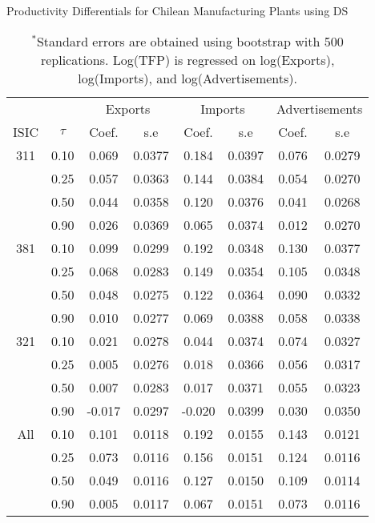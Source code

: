 \documentclass[12pt]{article}
\begin{document}
\begin{table}[H]
\centering
\caption{Productivity Differentials for Chilean Manufacturing Plants using DS}
\small
\begin{tabular}{cccccccc}
  \hline\hline & & \multicolumn{2}{c}{Exports}  & \multicolumn{2}{c}{Imports} & \multicolumn{2}{c}{Advertisements} \\ \cmidrule(lr){3-4} \cmidrule(lr){5-6} \cmidrule(lr){7-8}ISIC & $\tau$ & Coef. & s.e & Coef. & s.e & Coef. & s.e \\ 
  \hline
311 & 0.10 & 0.069 & 0.0377 & 0.184 & 0.0397 & 0.076 & 0.0279 \\ 
   & 0.25 & 0.057 & 0.0363 & 0.144 & 0.0384 & 0.054 & 0.0270 \\ 
   & 0.50 & 0.044 & 0.0358 & 0.120 & 0.0376 & 0.041 & 0.0268 \\ 
   & 0.90 & 0.026 & 0.0369 & 0.065 & 0.0374 & 0.012 & 0.0270 \\ 
  381 & 0.10 & 0.099 & 0.0299 & 0.192 & 0.0348 & 0.130 & 0.0377 \\ 
   & 0.25 & 0.068 & 0.0283 & 0.149 & 0.0354 & 0.105 & 0.0348 \\ 
   & 0.50 & 0.048 & 0.0275 & 0.122 & 0.0364 & 0.090 & 0.0332 \\ 
   & 0.90 & 0.010 & 0.0277 & 0.069 & 0.0388 & 0.058 & 0.0338 \\ 
  321 & 0.10 & 0.021 & 0.0278 & 0.044 & 0.0374 & 0.074 & 0.0327 \\ 
   & 0.25 & 0.005 & 0.0276 & 0.018 & 0.0366 & 0.056 & 0.0317 \\ 
   & 0.50 & 0.007 & 0.0283 & 0.017 & 0.0371 & 0.055 & 0.0323 \\ 
   & 0.90 & -0.017 & 0.0297 & -0.020 & 0.0399 & 0.030 & 0.0350 \\ 
  All & 0.10 & 0.101 & 0.0118 & 0.192 & 0.0155 & 0.143 & 0.0121 \\ 
   & 0.25 & 0.073 & 0.0116 & 0.156 & 0.0151 & 0.124 & 0.0116 \\ 
   & 0.50 & 0.049 & 0.0116 & 0.127 & 0.0150 & 0.109 & 0.0114 \\ 
   & 0.90 & 0.005 & 0.0117 & 0.067 & 0.0151 & 0.073 & 0.0116 \\ 
   \hline
\end{tabular}
\caption*{\footnotesize $^{*}$Standard errors are obtained using bootstrap with 500 replications. Log(TFP) is regressed on log(Exports), log(Imports), and log(Advertisements).}
\label{QACFCHLTFPP}
\end{table}
\end{document}
